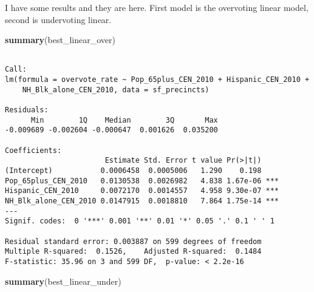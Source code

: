 \documentclass[12pt,twoside]{reedthesis}
\newenvironment{Shaded}{\begin{snugshade}}{\end{snugshade}}
\newcommand{\KeywordTok}[1]{\textcolor[rgb]{0.13,0.29,0.53}{\textbf{#1}}}
\newcommand{\NormalTok}[1]{#1}
\theoremstyle{definition}
\theoremstyle{definition}
\theoremstyle{definition}
\theoremstyle{remark}
\begin{document}
I have some results and they are here. First model is the overvoting
linear model, second is undervoting linear.
\begin{Shaded}
\begin{Highlighting}[]
\KeywordTok{summary}\NormalTok{(best_linear_over)}
\end{Highlighting}
\end{Shaded}
\begin{verbatim}

Call:
lm(formula = overvote_rate ~ Pop_65plus_CEN_2010 + Hispanic_CEN_2010 + 
    NH_Blk_alone_CEN_2010, data = sf_precincts)

Residuals:
      Min        1Q    Median        3Q       Max 
-0.009689 -0.002604 -0.000647  0.001626  0.035200 

Coefficients:
                       Estimate Std. Error t value Pr(>|t|)    
(Intercept)           0.0006458  0.0005006   1.290    0.198    
Pop_65plus_CEN_2010   0.0130538  0.0026982   4.838 1.67e-06 ***
Hispanic_CEN_2010     0.0072170  0.0014557   4.958 9.30e-07 ***
NH_Blk_alone_CEN_2010 0.0147915  0.0018810   7.864 1.75e-14 ***
---
Signif. codes:  0 '***' 0.001 '**' 0.01 '*' 0.05 '.' 0.1 ' ' 1

Residual standard error: 0.003887 on 599 degrees of freedom
Multiple R-squared:  0.1526,    Adjusted R-squared:  0.1484 
F-statistic: 35.96 on 3 and 599 DF,  p-value: < 2.2e-16
\end{verbatim}
\begin{Shaded}
\begin{Highlighting}[]
\KeywordTok{summary}\NormalTok{(best_linear_under)}
\end{Highlighting}
\end{Shaded}
\end{document}
